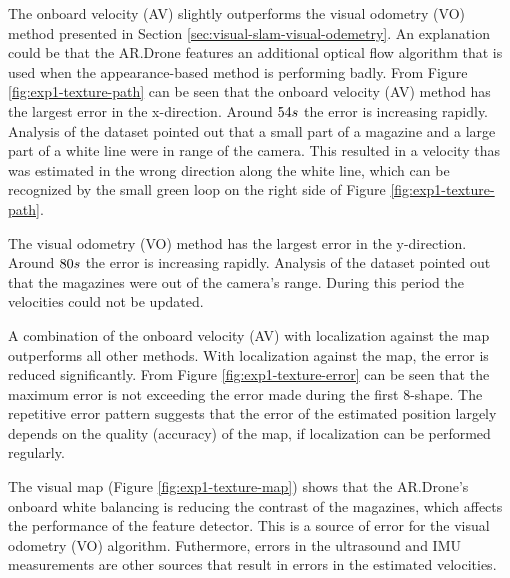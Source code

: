 The onboard velocity (AV) slightly outperforms the visual odometry (VO) method presented in Section \ref{sec:visual-slam-visual-odemetry}.
An explanation could be that the AR.Drone features an additional optical flow algorithm that is used when the appearance-based method is performing badly.
From Figure \ref{fig:exp1-texture-path} can be seen that the onboard velocity (AV) method has the largest error in the x-direction.
Around $54\begin{small}s\end{small}$ the error is increasing rapidly.
Analysis of the dataset pointed out that a small part of a magazine and a large part of a white line were in range of the camera.
This resulted in a velocity thas was estimated in the wrong direction along the white line, which can be recognized by the small green loop on the right side of Figure \ref{fig:exp1-texture-path}.

The visual odometry (VO) method has the largest error in the y-direction.
Around $80\begin{small}s\end{small}$ the error is increasing rapidly.
Analysis of the dataset pointed out that the magazines were out of the camera's range. During this period the velocities could not be updated.

A combination of the onboard velocity (AV) with localization against the map outperforms all other methods.
With localization against the map, the error is reduced significantly.
From Figure \ref{fig:exp1-texture-error} can be seen that the maximum error is not exceeding the error made during the first 8-shape.
The repetitive error pattern suggests that the error of the estimated position largely depends on the quality (accuracy) of the map, if localization can be performed regularly.

The visual map (Figure \ref{fig:exp1-texture-map}) shows that the AR.Drone's onboard white balancing is reducing the contrast of the magazines, which affects the performance of the feature detector.
This is a source of error for the visual odometry (VO) algorithm.
Futhermore, errors in the ultrasound and IMU measurements are other sources that result in errors in the estimated velocities.

